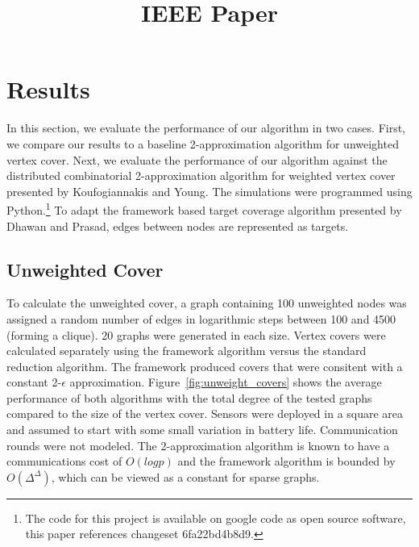 \documentclass[conference, 11pt]{IEEEtran}
\theoremstyle{definition}
\begin{document}
\title{IEEE Paper} 

\author{
}

\maketitle

\begin{abstract}

\end{abstract}

\section{Results} 
In this section, we evaluate the performance of our algorithm in two cases. First, we compare our results to a baseline 2-approximation algorithm for unweighted vertex cover.\cite{500824} Next, we evaluate the performance of our algorithm against the distributed combinatorial 2-approximation algorithm for weighted vertex cover presented by Koufogiannakis and Young.\cite{1582746} The simulations were programmed using Python.\footnote{The code for this project is available on google code as open source software, this paper references changeset 6fa22bd4b8d9.} To adapt the framework based target coverage algorithm presented by Dhawan and Prasad\cite{IPDPS.2008.45361}, edges between nodes are represented as targets. 
\subsection{Unweighted Cover}
To calculate the unweighted cover, a graph containing 100 unweighted nodes was assigned a random number of edges in logarithmic steps between 100 and 4500 (forming a clique). 20 graphs were generated in each size. Vertex covers were calculated separately using the framework algorithm versus the standard reduction algorithm. The framework produced covers that were consitent with a constant 2-$\epsilon$ approximation. Figure~\ref{fig:unweight_covers} shows the average performance of both algorithms with the total degree of the tested graphs compared to the size of the vertex cover. Sensors were deployed in a square area and assumed to start with some small variation in battery life. Communication rounds were not modeled. The 2-approximation algorithm is known to have a communications cost of $O(log p)$ and the framework algorithm is bounded by $O(\Delta^\Delta)$, which can be viewed as a constant for sparse graphs.

\begin{figure}
\end{figure}

  

\end{document}
